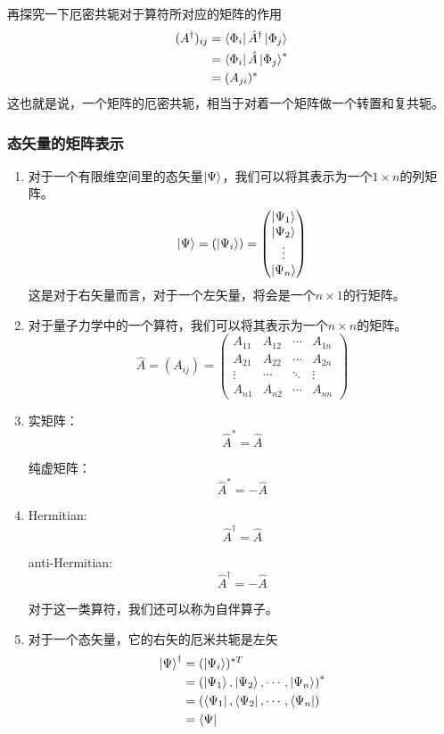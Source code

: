 \documentclass{article}
\newcommand{\h}[1]{\hat{#1}}
\begin{document}
\begin{enumerate}
    再探究一下厄密共轭对于算符所对应的矩阵的作用
    \begin{align*}
        (A^\dagger)_{ij}&=\bra{\Phi_i}\h{A}^\dagger\ket{\Phi_j}\\
        &=\bra{\Phi_i}\h{A}\ket{\Phi_j}^*\\
        &=(A_{ji})^*
    \end{align*}
    这也就是说，一个矩阵的厄密共轭，相当于对着一个矩阵做一个转置和复共轭。
\end{enumerate}

\subsubsection{态矢量的矩阵表示}

\begin{enumerate}
    \item 对于一个有限维空间里的态矢量$\ket{\Psi}$，我们可以将其表示为一个$1\times n$的列矩阵。
    \[\ket{\Psi}=(\ket{\Psi_i})=
    \begin{pmatrix}
        \ket{\Psi_1}\\
        \ket{\Psi_2}\\
        \vdots\\
        \ket{\Psi_n}
    \end{pmatrix}
    \]
    这是对于右矢量而言，对于一个左矢量，将会是一个$n\times 1$的行矩阵。
    \item 对于量子力学中的一个算符，我们可以将其表示为一个$n\times n$的矩阵。
    \[
        \hat{A}=(A_{ij})=
        \begin{pmatrix}
            A_{11}&A_{12}&\cdots&A_{1n}\\
            A_{21}&A_{22}&\cdots&A_{2n}\\
            \vdots&\cdots&\ddots&\vdots\\
            A_{n1}&A_{n2}&\cdots&A_{nn}
        \end{pmatrix}
    \]
    \item 实矩阵：\[\hat{A}^*=\hat{A}\]
        
        纯虚矩阵：\[\hat{A}^*=-\hat{A}\]
    \item Hermitian:\[\hat{A}^\dagger=\hat{A}\]

        anti-Hermitian:\[\hat{A}^\dagger=-\hat{A}\]
    
        对于这一类算符，我们还可以称为自伴算子。
    \item 对于一个态矢量，它的右矢的厄米共轭是左矢
        \begin{align*}
            \ket{\Psi}^\dagger&=(\ket{\Psi_i})^{*T}\\
            &=\left(\ket{\Psi_1},\ket{\Psi_2},\cdots,\ket{\Psi_n}\right)^{*}\\
            &=\left(\bra{\Psi_1},\bra{\Psi_2},\cdots,\bra{\Psi_n}\right)\\
            &=\bra{\Psi}  
        \end{align*}
    

\end{enumerate}
\end{document}
